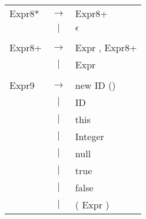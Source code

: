 \documentclass{article}
\begin{document}
\begin{tabular}{ l c l }
	Expr8* & $\rightarrow$ & Expr8+ \\
  	& $|$ & $\epsilon$ \\
	\\

	Expr8+ & $\rightarrow$ & Expr , Expr8+ \\
  	& $|$ & Expr \\
	\\

	Expr9 & $\rightarrow$ & new ID () \\
 	& $|$ & ID \\
 	& $|$ & this \\
 	& $|$ & Integer \\
 	& $|$ & null \\
 	& $|$ & true \\
 	& $|$ & false \\
	& $|$ & ( Expr ) \\





\end{tabular}

\end{document}
